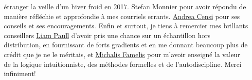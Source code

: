 étranger la veille d'un hiver froid en 2017. \href{https://www.iro.umontreal.ca/~monnier/}{Stefan Monnier} pour avoir répondu de manière réfléchie et approfondie à mes courriels errants. \href{https://censi.science/}{Andrea Censi} pour ses conseils et ses encouragements. Enfin et surtout, je tiens à remercier mes brillants conseillers \href{http://liampaull.ca/}{Liam Paull} d'avoir pris une chance sur un échantillon hors distribution, en fournissant de forts gradients et en me donnant beaucoup plus de crédit que je ne le méritais, et \href{https://michalis.famelis.info/}{Michalis Famelis} pour m'avoir enseigné la valeur de la logique intuitionniste, des méthodes formelles et de l'autodiscipline. Merci infiniment!
